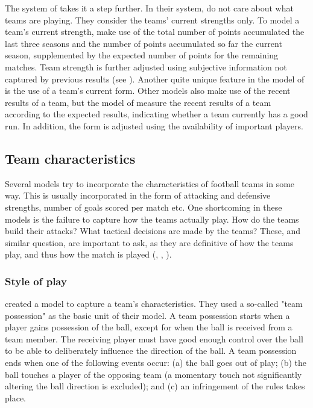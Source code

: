The system of \citet{bib:constantinou-fenton-neil-2012} takes it a step further. In their system, \citet{bib:constantinou-fenton-neil-2012} do not care about what teams are playing. They consider the teams' current strengths only. To model a team's current strength, \citet{bib:constantinou-fenton-neil-2012} make use of the total number of points accumulated the last three seasons and the number of points accumulated so far the current season, supplemented by the expected number of points for the remaining matches. Team strength is further adjusted using subjective information not captured by previous results (see ). Another quite unique feature in the model of \citet{bib:constantinou-fenton-neil-2012} is the use of a team's current form. Other models also make use of the recent results of a team, but the model of \citet{bib:constantinou-fenton-neil-2012} measure the recent results of a team according to the expected results, indicating whether a team currently has a good run. In addition, the form is adjusted using the availability of important players.

\subsection{Team characteristics}

Several models try to incorporate the characteristics of football teams in some way. This is usually incorporated in the form of attacking and defensive strengths, number of goals scored per match etc. One shortcoming in these models is the failure to capture how the teams actually play. How do the teams build their attacks? What tactical decisions are made by the teams? These, and similar question, are important to ask, as they are definitive of how the teams play, and thus how the match is played (\citet{bib:pollard-reep-1997}, \citet{bib:bialkowski-lucey-carr-yue-sridharan-matthews-2014}, \citet{bib:hirotsu-wright-2003}).

\subsubsection{Style of play}

\citet{bib:pollard-reep-1997} created a model to capture a team's characteristics. They used a so-called "team possession" as the basic unit of their model. A team possession starts when a player gains possession of the ball, except for when the ball is received from a team member. The receiving player must have good enough control over the ball to be able to deliberately influence the direction of the ball. A team possession ends when one of the following events occur: (a) the ball goes out of play; (b) the ball touches a player of the opposing team (a momentary touch not significantly altering the ball direction is excluded); and (c) an infringement of the rules takes place.

